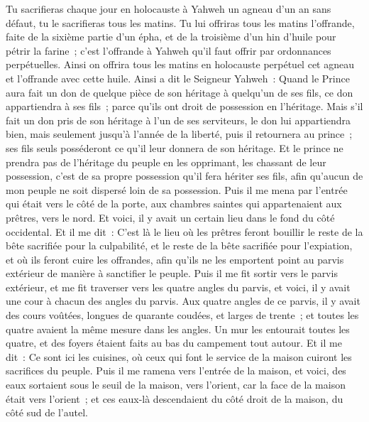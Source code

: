 \begin{multicols}{2}
Tu sacrifieras chaque jour en holocauste à Yahweh un agneau d'un an sans défaut, tu le sacrifieras tous les matins.
Tu lui offriras tous les matins l'offrande, faite de la sixième partie d'un épha, et de la troisième d'un hin d'huile pour pétrir la farine~; c'est l'offrande à Yahweh qu'il faut offrir par ordonnances perpétuelles.
Ainsi on offrira tous les matins en holocauste perpétuel cet agneau et l'offrande avec cette huile.
Ainsi a dit le Seigneur Yahweh~: Quand le Prince aura fait un don de quelque pièce de son héritage à quelqu'un de ses fils, ce don appartiendra à ses fils~; parce qu'ils ont droit de possession en l'héritage.
Mais s'il fait un don pris de son héritage à l'un de ses serviteurs, le don lui appartiendra bien, mais seulement jusqu'à l'année de la liberté, puis il retournera au prince~; ses fils seuls posséderont ce qu'il leur donnera de son héritage.
Et le prince ne prendra pas de l'héritage du peuple en les opprimant, les chassant de leur possession, c'est de sa propre possession qu'il fera hériter ses fils, afin qu'aucun de mon peuple ne soit dispersé loin de sa possession.
Puis il me mena par l'entrée qui était vers le côté de la porte, aux chambres saintes qui appartenaient aux prêtres, vers le nord. Et voici, il y avait un certain lieu dans le fond du côté occidental.
Et il me dit~: C'est là le lieu où les prêtres feront bouillir le reste de la bête sacrifiée pour la culpabilité, et le reste de la bête sacrifiée pour l'expiation, et où ils feront cuire les offrandes, afin qu'ils ne les emportent point au parvis extérieur de manière à sanctifier le peuple.
Puis il me fit sortir vers le parvis extérieur, et me fit traverser vers les quatre angles du parvis, et voici, il y avait une cour à chacun des angles du parvis.
Aux quatre angles de ce parvis, il y avait des cours voûtées, longues de quarante coudées, et larges de trente~; et toutes les quatre avaient la même mesure dans les angles.
Un mur les entourait toutes les quatre, et des foyers étaient faits au bas du campement tout autour.
Et il me dit~: Ce sont ici les cuisines, où ceux qui font le service de la maison cuiront les sacrifices du peuple.
\VerseOne{}Puis il me ramena vers l'entrée de la maison, et voici, des eaux sortaient sous le seuil de la maison, vers l'orient, car la face de la maison était vers l'orient~; et ces eaux-là descendaient du côté droit de la maison, du côté sud de l'autel.

\end{multicols}
